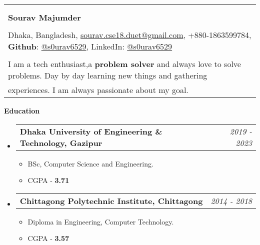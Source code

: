 \documentclass[legalpaper,10pt]{article}
\makeatletter
\newcommand{\resheading}[1]{{\large \colorbox{mygrey}{\begin{minipage}{\textwidth}{\textbf{#1 \vphantom{p\^{E}}}}\end{minipage}}}}
\newcommand{\ressubheading}[4]{
	\begin{tabular*}{7.1in}{l@{\extracolsep{\fill}}r}
		\textbf{#1} & \textit{#4} \\
	\end{tabular*}\vspace{-6pt}}
\makeatother
\begin{document}
	\begin{tabular*}{7.5in}{l@{\extracolsep{\fill}}}
		\\
		\\
		\\
		\textbf{\large Sourav Majumder}\\
		\\
		Dhaka, Bangladesh, \href{mailto:sourav.cse18.duet@gmail.com}{sourav.cse18.duet@gmail.com}, +880-1863599784, \textbf{Github}: \href{https://github.com/s0urav6529}{@s0urav6529}, LinkedIn: \href{https://www.linkedin.com/in/s0urav6529/}{@s0urav6529} 
		\\
		\\
		I am a tech enthusiast,a \textbf{problem solver} and always love to solve problems.         Day by day learning new things and gathering \\ experiences. I am always
            passionate about my goal.
	\end{tabular*}
	
	\vspace{0.25in}
	
	\resheading{Education}
	\begin{itemize}
	    \vspace{0.10in}
		\item \ressubheading{Dhaka University of Engineering \& Technology, Gazipur}{}{}{ 2019 -  2023}
		\begin{itemize}
			\item BSc, Computer Science and Engineering.
                \item CGPA - \textbf{3.71}
		\end{itemize}

            \item \ressubheading{Chittagong Polytechnic Institute, Chittagong}{}{}{2014 - 2018}
		\begin{itemize}
			\item Diploma in Engineering, Computer Technology.
                \item CGPA - \textbf{3.57}
		\end{itemize}
	
	\end{itemize}
	
	\vspace{0.25in}
	
\end{document}
